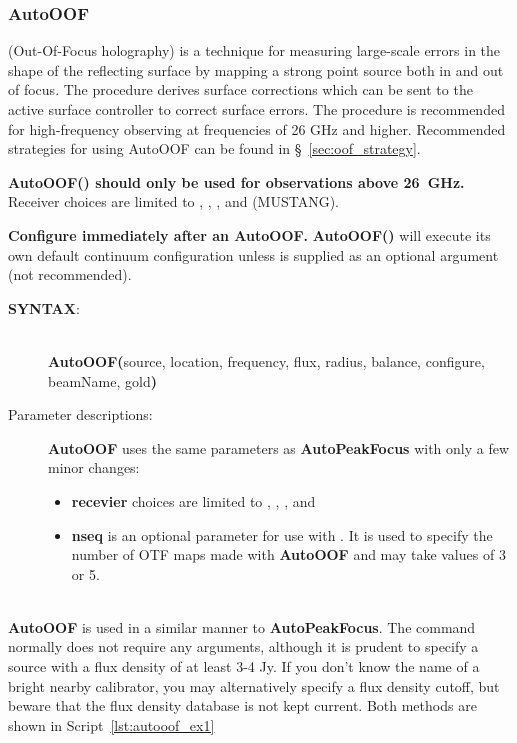 \subsubsection{AutoOOF}\label{sec:AutoOOFsec}

 (Out-Of-Focus holography) is a technique for measuring large-scale
errors in the shape of the reflecting surface by mapping a strong point source
both in and out of focus.  The procedure derives surface corrections which
can be sent to the active surface controller to correct surface errors. The
procedure is recommended for high-frequency observing at frequencies of 26 GHz
and higher.  Recommended strategies for using AutoOOF can be found in
\S~\ref{sec:oof_strategy}.

{\bf AutoOOF() should only be used for observations above 26~GHz.}
Receiver choices are limited to , , ,
and  (MUSTANG).

{\bf Configure immediately after an AutoOOF.}
{\bfseries{\textcolor{pythonKeywords}{AutoOOF}}()} will execute its own
default continuum configuration unless  is supplied as an
optional argument (not recommended).

\begin{description}
\item[{\bf SYNTAX}:]\ \\
{\bfseries{\textcolor{pythonKeywords}{AutoOOF}}(}source, location,
frequency, flux, radius, balance, configure, beamName, gold{\bf)}
\item[Parameter descriptions:] {\bfseries{\textcolor{pythonKeywords}{AutoOOF}}} uses the
same parameters as {\bfseries{\textcolor{pythonKeywords}{AutoPeakFocus}}}
with only a few minor changes:
\begin{itemize}
\item {\bf recevier} choices are limited to , ,
, and 
\item {\bf nseq} is an optional parameter for use with .  It is used to
specify the number of \gls{OTF} maps made with
{\bfseries{\textcolor{pythonKeywords}{AutoOOF}}} and may take values of 3 or 5.
\end{itemize}
\end{description}

\\
\indent
{\bfseries{\textcolor{pythonKeywords}{AutoOOF}}} is used in a similar manner to
{\bfseries{\textcolor{pythonKeywords}{AutoPeakFocus}}}.
The command normally does not require any arguments, although it is prudent to
specify a source with a flux density of at least 3-4 Jy.  If you don't know the
name of a bright nearby calibrator, you may alternatively specify a flux density
cutoff, but beware that the flux density database is not kept current.  Both
methods are shown in Script~\ref{lst:autooof_ex1}


